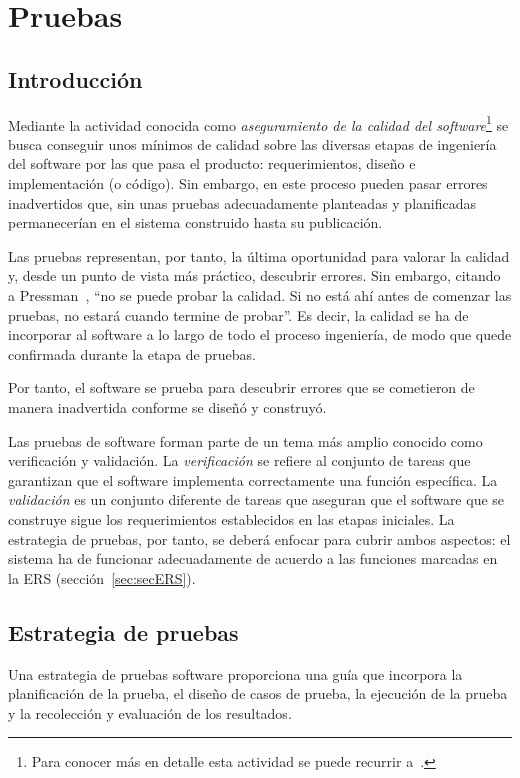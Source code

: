 \chapter{Pruebas}

\section{Introducción}

Mediante la actividad conocida como \emph{aseguramiento de la calidad del software}\footnote{Para conocer más en detalle esta actividad se puede recurrir a~\cite{Pre10}.} se busca conseguir unos mínimos de calidad sobre las diversas etapas de ingeniería del software por las que pasa el producto: requerimientos, diseño e implementación (o código). Sin embargo, en este proceso pueden pasar errores inadvertidos que, sin unas pruebas adecuadamente planteadas y planificadas permanecerían en el sistema construido hasta su publicación.

Las pruebas representan, por tanto, la última oportunidad para valorar la calidad y, desde un punto de vista más práctico, descubrir errores. Sin embargo, citando a Pressman~\cite{Pre10}, ``no se puede probar la calidad. Si no está ahí antes de comenzar las pruebas, no estará cuando termine de probar''. Es decir, la calidad se ha de incorporar al software a lo largo de todo el proceso ingeniería, de modo que quede confirmada durante la etapa de pruebas.

Por tanto, el software se prueba para descubrir errores que se cometieron de manera inadvertida conforme se diseñó y construyó.

Las pruebas de software forman parte de un tema más amplio conocido como verificación y validación. La \emph{verificación} se refiere al conjunto de tareas que garantizan que el software implementa correctamente una función específica. La \emph{validación} es un conjunto diferente de tareas que aseguran que el software que se construye sigue los requerimientos establecidos en las etapas iniciales. La estrategia de pruebas, por tanto, se deberá enfocar para cubrir ambos aspectos: el sistema ha de funcionar adecuadamente de acuerdo a las funciones marcadas en la ERS (sección~\ref{sec:secERS}).

\section{Estrategia de pruebas}

Una estrategia de pruebas software proporciona una guía que incorpora la planificación de la prueba, el diseño de casos de prueba, la ejecución de la prueba y la recolección y evaluación de los resultados.

